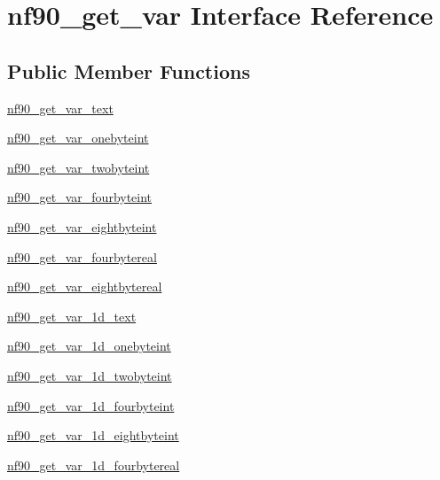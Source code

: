 \hypertarget{interfacenf90__get__var}{}\section{nf90\+\_\+get\+\_\+var Interface Reference}
\label{interfacenf90__get__var}
\subsection*{Public Member Functions}
\begin{DoxyCompactItemize}
\item 
\hyperlink{interfacenf90__get__var_a138495f8ab04ceb372aa5aaddd017b83}{nf90\+\_\+get\+\_\+var\+\_\+text}
\item 
\hyperlink{interfacenf90__get__var_a64b5d75335a563f01efaddfda2a3804f}{nf90\+\_\+get\+\_\+var\+\_\+onebyteint}
\item 
\hyperlink{interfacenf90__get__var_a9b5a0918dfcd8853031b3c952c161e9c}{nf90\+\_\+get\+\_\+var\+\_\+twobyteint}
\item 
\hyperlink{interfacenf90__get__var_a3ca9a3d16c686217a7a20caf42909c8d}{nf90\+\_\+get\+\_\+var\+\_\+fourbyteint}
\item 
\hyperlink{interfacenf90__get__var_a6ba115a5bab9564c5097309beb3a487e}{nf90\+\_\+get\+\_\+var\+\_\+eightbyteint}
\item 
\hyperlink{interfacenf90__get__var_a2ccf5aea35b6a3316f2a1b046f0f0d60}{nf90\+\_\+get\+\_\+var\+\_\+fourbytereal}
\item 
\hyperlink{interfacenf90__get__var_a29b34b76c4c1b96368e59a9aa6bdabf0}{nf90\+\_\+get\+\_\+var\+\_\+eightbytereal}
\item 
\hyperlink{interfacenf90__get__var_a2508e84d236bb09de75e8d0cd0a527b1}{nf90\+\_\+get\+\_\+var\+\_\+1d\+\_\+text}
\item 
\hyperlink{interfacenf90__get__var_aea73466c86c4fdccc5ceb71218a40b5a}{nf90\+\_\+get\+\_\+var\+\_\+1d\+\_\+onebyteint}
\item 
\hyperlink{interfacenf90__get__var_a57f9895197381f6126b56765369f9585}{nf90\+\_\+get\+\_\+var\+\_\+1d\+\_\+twobyteint}
\item 
\hyperlink{interfacenf90__get__var_a24058c0f66a610334d6e7aad55e98639}{nf90\+\_\+get\+\_\+var\+\_\+1d\+\_\+fourbyteint}
\item 
\hyperlink{interfacenf90__get__var_abab8c3c3fb95fe3cfd0df48b7b135628}{nf90\+\_\+get\+\_\+var\+\_\+1d\+\_\+eightbyteint}
\item 
\hyperlink{interfacenf90__get__var_ab33148a23c8253e234e0b38b4c099f7f}{nf90\+\_\+get\+\_\+var\+\_\+1d\+\_\+fourbytereal}

\end{DoxyCompactItemize}
